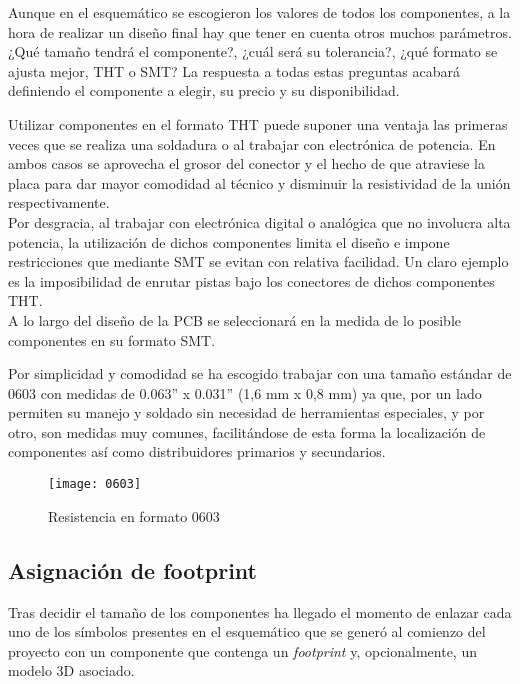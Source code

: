 Aunque en el esquemático se escogieron los valores de todos los componentes, a la hora de realizar un diseño final hay que tener en cuenta otros muchos parámetros. ¿Qué tamaño tendrá el componente?, ¿cuál será su tolerancia?, ¿qué formato se ajusta mejor, \acrshort{THT} o \acrshort{SMT}? La respuesta a todas estas preguntas acabará definiendo el componente a elegir, su precio y su disponibilidad.

Utilizar componentes en el formato \acrshort{THT} puede suponer una ventaja las primeras veces que se realiza una soldadura o al trabajar con electrónica de potencia. En ambos casos se aprovecha el grosor del conector y el hecho de que atraviese la placa para dar mayor comodidad al técnico y disminuir la resistividad de la unión respectivamente. 
\\Por desgracia, al trabajar con electrónica digital o analógica que no involucra alta potencia, la utilización de dichos componentes limita el diseño e impone restricciones que mediante \acrshort{SMT} se evitan con relativa facilidad. Un claro ejemplo es la imposibilidad de enrutar pistas bajo los conectores de dichos componentes \acrshort{THT}.
\\A lo largo del diseño de la \acrshort{PCB} se seleccionará en la medida de lo posible componentes en su formato \acrshort{SMT}.

Por simplicidad y comodidad se ha escogido trabajar con una tamaño estándar de 0603 con medidas de 0.063'' x 0.031'' (1,6 mm x 0,8 mm) ya que, por un lado permiten su manejo y soldado sin necesidad de herramientas especiales, y por otro, son medidas muy comunes, facilitándose de esta forma la localización de componentes así como distribuidores primarios y secundarios.

\begin{figure} [h]
    \centering
    \texttt{[image: 0603]}
    \caption{Resistencia en formato 0603 \cite{Imagen_0603}}
    \label{fig:0603}
\end{figure}

\subsection{Asignación de footprint\label{sec:Enlazado}}

Tras decidir el tamaño de los componentes ha llegado el momento de enlazar cada uno de los símbolos presentes en el esquemático que se generó al comienzo del proyecto con un componente que contenga un \textit{footprint} y, opcionalmente, un modelo 3D asociado.


